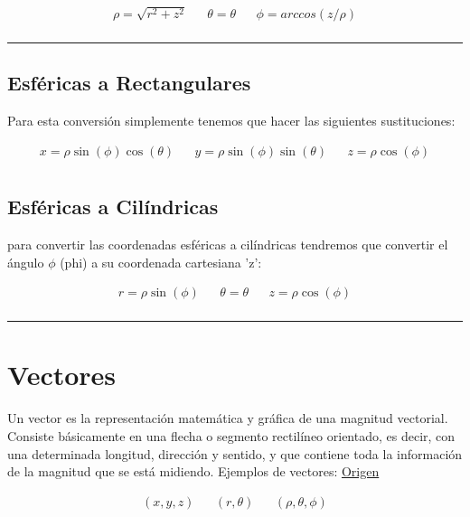 \documentclass{article}
\begin{document}
\[\begin{aligned}
 \rho = \sqrt{r^2+z^2} && 
 \theta = \theta  &&
 \phi = arccos\left( z/\rho \right) \\
\end{aligned}\] 

\noindent\rule{\textwidth}{0.5pt}

\subsection{Esféricas a Rectangulares}
\label{sec:org97f7358}
Para esta conversión simplemente tenemos que hacer las siguientes sustituciones:

\[\begin{aligned}
 x = \rho \sin(\phi)\cos(\theta) && 
 y = \rho \sin(\phi)\sin(\theta) &&
 z = \rho \cos(\phi) \\
\end{aligned}\] 

\subsection{Esféricas a Cilíndricas}
\label{sec:orgebdc051}
para convertir las coordenadas esféricas a cilíndricas tendremos que convertir el ángulo \(\phi\) (phi) a su coordenada cartesiana 'z':

\[\begin{aligned}
 r = \rho \sin(\phi) && 
 \theta = \theta &&
 z = \rho \cos(\phi) \\
\end{aligned}\] 

\noindent\rule{\textwidth}{0.5pt}


\section{Vectores}
\label{sec:org20308fe}
Un vector es la representación matemática y gráfica de una magnitud vectorial. Consiste básicamente en una flecha o segmento rectilíneo orientado, es decir, con una determinada longitud, dirección y sentido, y que contiene toda la información de la magnitud que se está midiendo. Ejemplos de vectores:  \href{https://ingemecanica.com/tutoriales/calculo\_vectorial.html}{Origen}

\[\begin{aligned}
  (x,y,z) && (r,\theta) && (\rho, \theta, \phi) \\
\end{aligned}\] 
\end{document}
